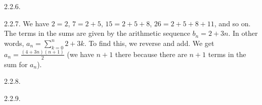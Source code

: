 \begin {itemize}
\begin{ans}{2.2.6.}
\end{ans}
\begin{ans}{2.2.7.}
		We have $2 = 2$, $7 = 2+5$, $15 = 2 + 5 + 8$, $26 = 2+5+8+11$, and so on.  The terms in the sums are given by the arithmetic sequence $b_n = 2+3n$.  In other words, $a_n = \sum_{k=0}^n 2+3k$.  To find this, we reverse and add.  We get $a_n = \frac{(4+3n)(n+1)}{2}$ (we have $n+1$ there because there are $n+1$ terms in the sum for $a_n$).
	
\end{ans}
\begin{ans}{2.2.8.}
	
\end{ans}
\begin{ans}{2.2.9.}
\end{ans}
\end{itemize}
